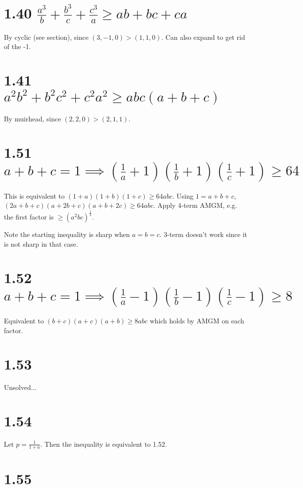 \documentclass{article}
\begin{document}
\section*{1.40 $\frac{a^3}{b} + \frac{b^3}{c} + \frac{c^3}{a} \ge ab + bc + ca$}

By cyclic (see section), since $(3, -1, 0) > (1, 1, 0)$. Can also expand to get rid of the -1.

\section*{1.41 $a^2b^2 + b^2c^2 + c^2a^2 \ge abc(a+b+c)$}

By muirhead, since $(2, 2, 0) > (2, 1, 1)$.

\section*{1.51 $a + b + c = 1 \implies \left(\frac{1}{a}+1\right) \left(\frac{1}{b}+1\right) \left(\frac{1}{c}+1\right) \ge 64$}

This is equivalent to $(1+a)(1+b)(1+c) \ge 64abc$. Using $1 = a+b+c$, $(2a + b + c)(a + 2b + c)(a + b + 2c) \ge 64abc$. Apply 4-term AMGM, e.g. the first factor is $\ge (a^2bc)^\frac{1}{4}$.

Note the starting inequality is sharp when $a=b=c$. 3-term doesn't work since it is not sharp in that case.

\section*{1.52 $a + b + c = 1 \implies \left(\frac{1}{a}-1\right) \left(\frac{1}{b}-1\right) \left(\frac{1}{c}-1\right) \ge 8$}

Equivalent to $(b+c)(a+c)(a+b) \ge 8abc$ which holds by AMGM on each factor.

\section*{1.53}

Unsolved...

\section*{1.54}

Let $p = \frac{1}{1+a}$. Then the inequality is equivalent to 1.52.

\section*{1.55}
\end{document}
